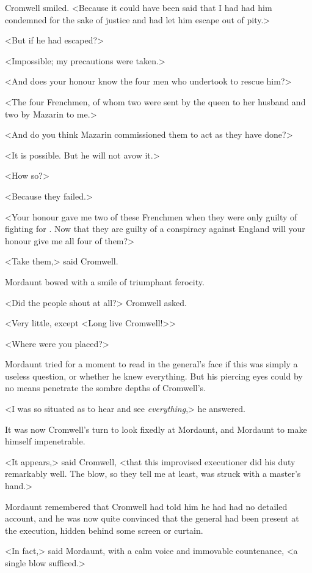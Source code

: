 Cromwell smiled. <Because it could have been said that I had had him condemned for the sake of justice and had let him escape out of pity.>

<But if he had escaped?>

<Impossible; my precautions were taken.>

<And does your honour know the four men who undertook to rescue him?>

<The four Frenchmen, of whom two were sent by the queen to her husband and two by Mazarin to me.>

<And do you think Mazarin commissioned them to act as they have done?>

<It is possible. But he will not avow it.>

<How so?>

<Because they failed.>

<Your honour gave me two of these Frenchmen when they were only guilty of fighting for .  Now that they are guilty of a conspiracy against England will your honour give me all four of them?>

<Take them,> said Cromwell.

Mordaunt bowed with a smile of triumphant ferocity.

<Did the people shout at all?> Cromwell asked.

<Very little, except <Long live Cromwell!>>

<Where were you placed?>

Mordaunt tried for a moment to read in the general's face if this was simply a useless question, or whether he knew everything. But his piercing eyes could by no means penetrate the sombre depths of Cromwell's.

<I was so situated as to hear and see \emph{everything},> he answered.

It was now Cromwell's turn to look fixedly at Mordaunt, and Mordaunt to make himself impenetrable.

<It appears,> said Cromwell, <that this improvised executioner did his duty remarkably well. The blow, so they tell me at least, was struck with a master's hand.>

Mordaunt remembered that Cromwell had told him he had had no detailed account, and he was now quite convinced that the general had been present at the execution, hidden behind some screen or curtain.

<In fact,> said Mordaunt, with a calm voice and immovable countenance, <a single blow sufficed.>

